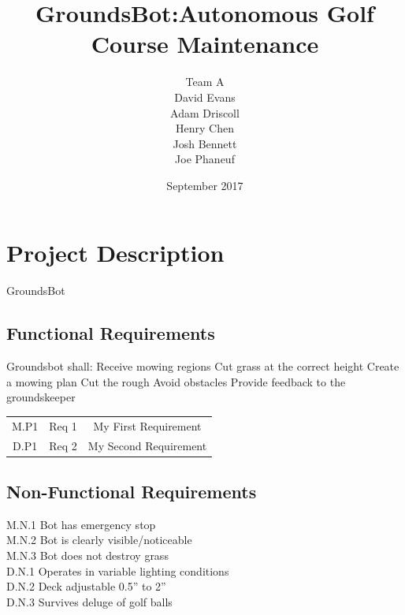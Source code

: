 \documentclass{article}
\begin{document}
\title{GroundsBot:Autonomous Golf Course Maintenance}
\date{September 2017}
\author{Team A        \\ David Evans \\
        Adam Driscoll \\ Henry Chen  \\
        Josh Bennett  \\ Joe Phaneuf \\ }
\maketitle
\newpage

\tableofcontents
\newpage

\section{Project Description}
GroundsBot \\
\subsection{Functional Requirements}
Groundsbot shall:
  Receive mowing regions
  Cut grass at the correct height
  Create a mowing plan
  Cut the rough 
  Avoid obstacles
  Provide feedback to the groundskeeper
\begin{center}
\begin{tabular}{ |c|c|c| }
  \hline
    M.P1 & Req 1 & My First Requirement \\
    D.P1 & Req 2 & My Second Requirement \\
  \hline
\end{tabular}
\end{center}

\subsection{Non-Functional Requirements}
M.N.1 Bot has emergency stop \\
M.N.2 Bot is clearly visible/noticeable \\
M.N.3 Bot does not destroy grass \\
D.N.1 Operates in variable lighting conditions \\
D.N.2 Deck adjustable 0.5” to 2” \\
D.N.3 Survives deluge of golf balls \\
\end{document}
